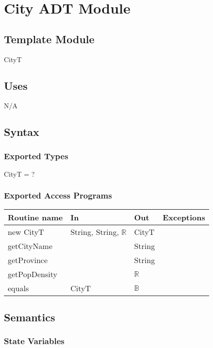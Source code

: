 \documentclass[12pt]{article}
\begin{document}
\newpage

\section* {City ADT Module}

\subsection* {Template Module}

CityT

\subsection* {Uses}

N/A

\subsection* {Syntax}

\subsubsection* {Exported Types}

CityT = ?


\subsubsection* {Exported Access Programs}

\begin{tabular}{| l | l | l | l |}
\hline
\textbf{Routine name} & \textbf{In} & \textbf{Out} & \textbf{Exceptions}\\
\hline
new CityT & String, String, $\mathbb{R}$ & CityT & \\
\hline
getCityName & ~ & String & \\
\hline
getProvince &~ & String & \\
\hline
getPopDensity & ~ & $\mathbb{R}$ & \\
\hline
equals & CityT & $\mathbb{B}$ & \\
\hline
\end{tabular}

\newpage

\subsection* {Semantics}

\subsubsection* {State Variables}
\end{document}
